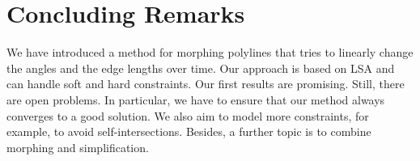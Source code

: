 \section{Concluding Remarks}
\label{sec:Morph_Conclusion}

We have introduced a method for morphing polylines 
that tries to linearly change 
the angles and the edge lengths over time. 
Our approach is based on LSA 
and can handle soft and hard constraints. 
Our first results are promising. 
Still, there are open problems. 
In particular, we have to ensure that 
our method always converges to a good solution. 
We also aim to model more constraints, 
for example, to avoid self-intersections. 
Besides, a further topic is 
to combine morphing and simplification.







